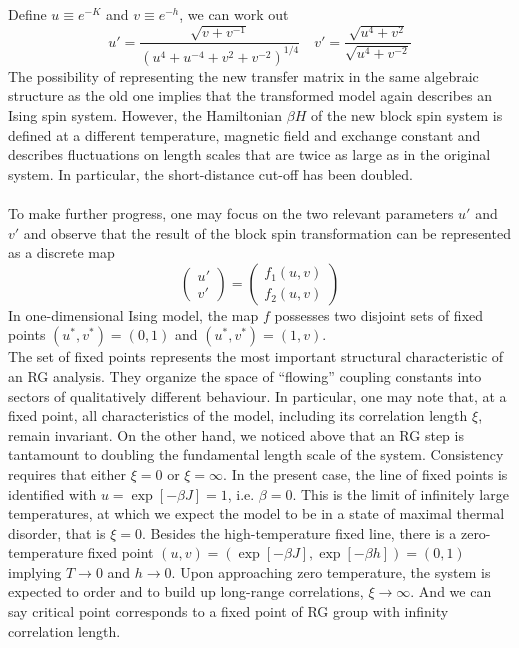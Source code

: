 Define $u \equiv e^{-K}$ and $v \equiv e^{-h}$, we can work out
\[u' = \frac{\sqrt{v+v^{-1}}}{(u^4 + u^{-4} + v^2 + v^{-2})^{1/4}} \quad v' = \frac{\sqrt{u^4 + v^2}}{\sqrt{u^4 + v^{-2}}}\]
The possibility of representing the new transfer matrix in the same algebraic structure as the old one implies that the transformed model again describes an Ising spin system. However, the Hamiltonian $\beta H$ of the new block spin system is defined at a different temperature, magnetic field and exchange constant and describes fluctuations on length scales that are twice as large as in the original system.
In particular, the short-distance cut-off has been doubled.
\\ \\
To make further progress, one may focus on the two relevant parameters $u'$ and $v'$ and observe that the result of the block spin transformation can be represented as a discrete map
\[\begin{pmatrix} u' \\ v' \end{pmatrix} = \begin{pmatrix}
f_1(u,v) \\ f_2(u,v)
\end{pmatrix} \]
In one-dimensional Ising model, the map $f$ possesses two
disjoint sets of fixed points $(u^*,v^*) = (0,1)$ and $(u^*,v^*) = (1,v)$.
\\
The set of fixed points represents the most important structural characteristic of an RG analysis. They organize the space of ``flowing'' coupling constants into sectors of qualitatively different behaviour. 
In particular, one may note that, at a fixed point, all characteristics of the model, including its correlation length $\xi$, remain invariant. 
On the other hand, we noticed above that an RG step is tantamount to doubling the fundamental length scale of the system. Consistency requires that either $\xi = 0$ or $\xi = \infty$. 
In the present case, the line of fixed points is identified with $u = \exp[-\beta J] = 1$, i.e. $\beta = 0$. 
This is the limit of infinitely large temperatures, at which we expect the model to be in a state of maximal thermal disorder, that is $\xi = 0$. 
Besides the high-temperature fixed line, there is a zero-temperature fixed point $(u, v) = (\exp[−\beta J], \exp[−\beta h]) = (0, 1)$ implying $T \to 0$ and $h \to 0$. Upon approaching zero temperature, the system is expected to order and to build up long-range correlations, $\xi \to \infty$. And we can say critical point corresponds to a fixed point of RG group with infinity correlation length.
